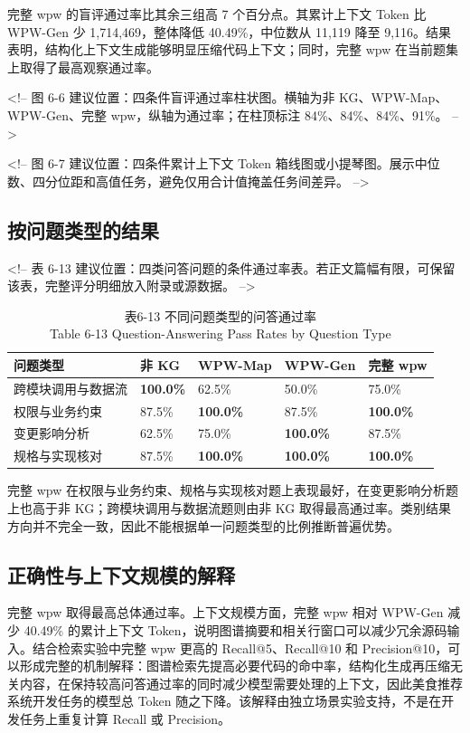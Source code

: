 完整 wpw 的盲评通过率比其余三组高 7 个百分点。其累计上下文 Token 比 WPW-Gen 少 1,714,469，整体降低 40.49\%，中位数从 11,119 降至 9,116。结果表明，结构化上下文生成能够明显压缩代码上下文；同时，完整 wpw 在当前题集上取得了最高观察通过率。

<!-- 图 6-6 建议位置：四条件盲评通过率柱状图。横轴为非 KG、WPW-Map、WPW-Gen、完整 wpw，纵轴为通过率；在柱顶标注 84\%、84\%、84\%、91\%。 -->

<!-- 图 6-7 建议位置：四条件累计上下文 Token 箱线图或小提琴图。展示中位数、四分位距和高值任务，避免仅用合计值掩盖任务间差异。 -->


\subsection{按问题类型的结果}
<!-- 表 6-13 建议位置：四类问答问题的条件通过率表。若正文篇幅有限，可保留该表，完整评分明细放入附录或源数据。 -->

\begin{table}[htbp]
\centering
\small
\caption{表6-13 不同问题类型的问答通过率\\Table 6-13 Question-Answering Pass Rates by Question Type}
\begin{tabularx}{\textwidth}{|X|X|X|X|X|}
\hline
\textbf{问题类型} & \textbf{非 KG} & \textbf{WPW-Map} & \textbf{WPW-Gen} & \textbf{完整 wpw} \\
\hline
跨模块调用与数据流 & \textbf{100.0\%} & 62.5\% & 50.0\% & 75.0\% \\
权限与业务约束 & 87.5\% & \textbf{100.0\%} & 87.5\% & \textbf{100.0\%} \\
变更影响分析 & 62.5\% & 75.0\% & \textbf{100.0\%} & 87.5\% \\
规格与实现核对 & 87.5\% & \textbf{100.0\%} & \textbf{100.0\%} & \textbf{100.0\%} \\
\hline
\end{tabularx}
\end{table}

完整 wpw 在权限与业务约束、规格与实现核对题上表现最好，在变更影响分析题上也高于非 KG；跨模块调用与数据流题则由非 KG 取得最高通过率。类别结果方向并不完全一致，因此不能根据单一问题类型的比例推断普遍优势。


\subsection{正确性与上下文规模的解释}
完整 wpw 取得最高总体通过率。上下文规模方面，完整 wpw 相对 WPW-Gen 减少 40.49\% 的累计上下文 Token，说明图谱摘要和相关行窗口可以减少冗余源码输入。结合检索实验中完整 wpw 更高的 Recall@5、Recall@10 和 Precision@10，可以形成完整的机制解释：图谱检索先提高必要代码的命中率，结构化生成再压缩无关内容，在保持较高问答通过率的同时减少模型需要处理的上下文，因此美食推荐系统开发任务的模型总 Token 随之下降。该解释由独立场景实验支持，不是在开发任务上重复计算 Recall 或 Precision。


